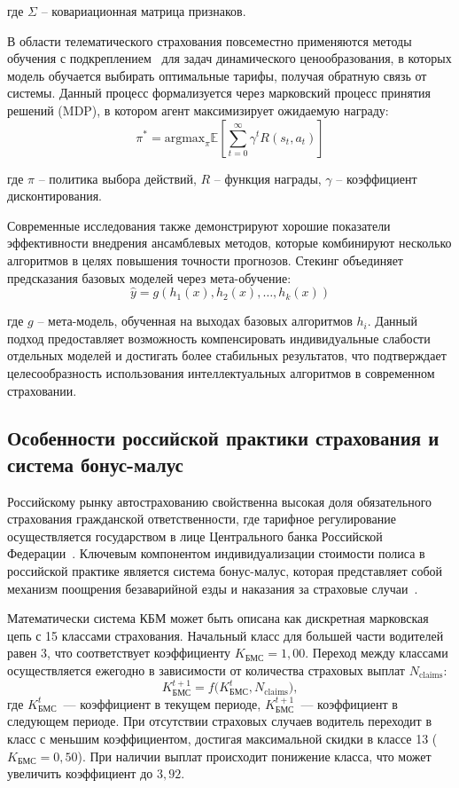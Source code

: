 где $\Sigma$ – ковариационная матрица признаков.

В области телематического страхования повсеместно применяются методы обучения с подкреплением~\cite{russell2020aima} для задач динамического ценообразования, в которых модель обучается выбирать оптимальные тарифы, получая обратную связь от системы. Данный процесс формализуется через марковский процесс принятия решений (MDP), в котором агент максимизирует ожидаемую награду:
\begin{equation*}
\pi^* = \mathrm{argmax}_\pi \mathbb{E} \left[ \sum_{t=0}^{\infty} \gamma^t R(s_t, a_t) \right]
\end{equation*}

где $\pi$ – политика выбора действий, $R$ – функция награды, $\gamma$ – коэффициент дисконтирования.

Современные исследования также демонстрируют хорошие показатели эффективности внедрения ансамблевых методов, которые комбинируют несколько алгоритмов в целях повышения точности прогнозов. Стекинг объединяет предсказания базовых моделей через мета-обучение:
\begin{equation*}
\hat{y} = g(h_1(x), h_2(x), \ldots, h_k(x))
\end{equation*}

где $g$ – мета-модель, обученная на выходах базовых алгоритмов $h_i$. Данный подход предоставляет возможность компенсировать индивидуальные слабости отдельных моделей и достигать более стабильных результатов, что подтверждает целесообразность использования интеллектуальных алгоритмов в современном страховании.

\subsection{Особенности российской практики страхования и система бонус-малус}

Российскому рынку автострахованию свойственна высокая доля обязательного страхования гражданской ответственности, где тарифное регулирование осуществляется государством в лице Центрального банка Российской Федерации~\cite{cbr2026osago}. Ключевым компонентом индивидуализации стоимости полиса в российской практике является система бонус-малус, которая представляет собой механизм поощрения безаварийной езды и наказания за страховые случаи~\cite{rgs2026kbm}.

Математически система КБМ может быть описана как дискретная марковская цепь с 15 классами страхования. Начальный класс для большей части водителей равен 3, что соответствует коэффициенту $K_{\text{БМС}} = 1{,}00$. Переход между классами осуществляется ежегодно в зависимости от количества страховых выплат $N_{\text{claims}}$:
\[
K_{\text{БМС}}^{t+1} = f\bigl(K_{\text{БМС}}^{t}, N_{\text{claims}}\bigr),
\]
где $K_{\text{БМС}}^{t}$~--- коэффициент в текущем периоде, $K_{\text{БМС}}^{t+1}$~--- коэффициент в следующем периоде. При отсутствии страховых случаев водитель переходит в класс с меньшим коэффициентом, достигая максимальной скидки в классе 13 ($K_{\text{БМС}} = 0{,}50$). При наличии выплат происходит понижение класса, что может увеличить коэффициент до $3{,}92$.

